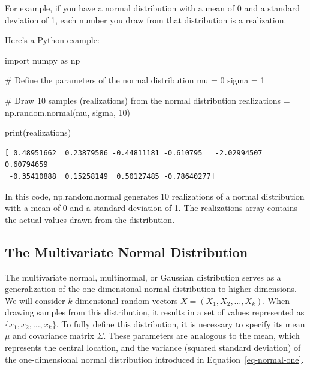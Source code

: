 \documentclass[
  letterpaper,
  DIV=11,
  numbers=noendperiod]{scrreprt}
\newenvironment{Shaded}{\begin{snugshade}}{\end{snugshade}}
\newcommand{\BuiltInTok}[1]{\textcolor[rgb]{0.00,0.23,0.31}{#1}}
\newcommand{\CommentTok}[1]{\textcolor[rgb]{0.37,0.37,0.37}{#1}}
\newcommand{\DecValTok}[1]{\textcolor[rgb]{0.68,0.00,0.00}{#1}}
\newcommand{\ImportTok}[1]{\textcolor[rgb]{0.00,0.46,0.62}{#1}}
\newcommand{\NormalTok}[1]{\textcolor[rgb]{0.00,0.23,0.31}{#1}}
\newcommand{\OperatorTok}[1]{\textcolor[rgb]{0.37,0.37,0.37}{#1}}
\begin{document}
For example, if you have a normal distribution with a mean of 0 and a
standard deviation of 1, each number you draw from that distribution is
a realization.

Here's a Python example:

\begin{Shaded}
\begin{Highlighting}[]
\ImportTok{import}\NormalTok{ numpy }\ImportTok{as}\NormalTok{ np}

\CommentTok{\# Define the parameters of the normal distribution}
\NormalTok{mu }\OperatorTok{=} \DecValTok{0}
\NormalTok{sigma }\OperatorTok{=} \DecValTok{1}

\CommentTok{\# Draw 10 samples (realizations) from the normal distribution}
\NormalTok{realizations }\OperatorTok{=}\NormalTok{ np.random.normal(mu, sigma, }\DecValTok{10}\NormalTok{)}

\BuiltInTok{print}\NormalTok{(realizations)}
\end{Highlighting}
\end{Shaded}

\begin{verbatim}
[ 0.48951662  0.23879586 -0.44811181 -0.610795   -2.02994507  0.60794659
 -0.35410888  0.15258149  0.50127485 -0.78640277]
\end{verbatim}

In this code, np.random.normal generates 10 realizations of a normal
distribution with a mean of 0 and a standard deviation of 1. The
realizations array contains the actual values drawn from the
distribution.

\subsection{The Multivariate Normal
Distribution}\label{the-multivariate-normal-distribution}

The multivariate normal, multinormal, or Gaussian distribution serves as
a generalization of the one-dimensional normal distribution to higher
dimensions. We will consider \(k\)-dimensional random vectors
\(X = (X_1, X_2, \ldots, X_k)\). When drawing samples from this
distribution, it results in a set of values represented as
\(\{x_1, x_2, \ldots, x_k\}\). To fully define this distribution, it is
necessary to specify its mean \(\mu\) and covariance matrix \(\Sigma\).
These parameters are analogous to the mean, which represents the central
location, and the variance (squared standard deviation) of the
one-dimensional normal distribution introduced in
Equation~\ref{eq-normal-one}.
\end{document}
